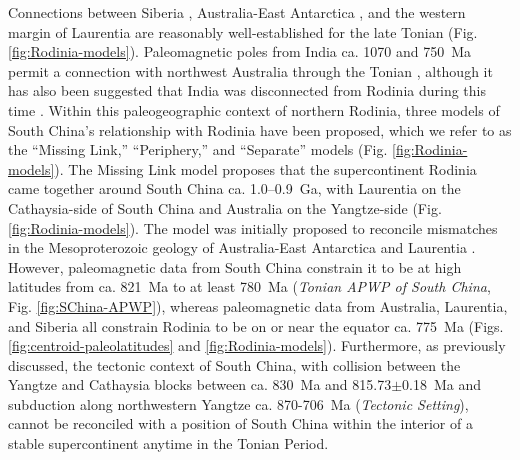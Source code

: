 Connections between Siberia \citep{Ernst2016a, Evans2016a}, Australia-East Antarctica \citep{Veevers1988a, Duebendorfer2002a, Goodge2008a, Goodge2010a, Li2011a, Swanson-Hysell2012a, Eyster2019a}, and the western margin of Laurentia are reasonably well-established for the late Tonian (Fig. \ref{fig:Rodinia-models}). Paleomagnetic poles from India ca. 1070 and 750~Ma permit a connection with northwest Australia through the Tonian \citep{Swanson-Hysell2012a}, although it has also been suggested that India was disconnected from Rodinia during this time \citep{Merdith2017a}. Within this paleogeographic context of northern Rodinia, three models of South China's relationship with Rodinia have been proposed, which we refer to as the ``Missing Link,'' ``Periphery,'' and ``Separate'' models (Fig. \ref{fig:Rodinia-models}). The Missing Link model proposes that the supercontinent Rodinia came together around South China ca. 1.0--0.9~Ga, with Laurentia on the Cathaysia-side of South China and Australia on the Yangtze-side (Fig. \ref{fig:Rodinia-models}). The model was initially proposed to reconcile mismatches in the Mesoproterozoic geology of Australia-East Antarctica and Laurentia \citep{Li1995a}. However, paleomagnetic data from South China constrain it to be at high latitudes from ca. 821~Ma to at least 780~Ma (\textit{Tonian APWP of South China}, Fig. \ref{fig:SChina-APWP}), whereas paleomagnetic data from Australia, Laurentia, and Siberia all constrain Rodinia to be on or near the equator ca. 775~Ma (Figs. \ref{fig:centroid-paleolatitudes} and \ref{fig:Rodinia-models}). Furthermore, as previously discussed, the tectonic context of South China, with collision between the Yangtze and Cathaysia blocks between ca. 830~Ma and 815.73$\pm$0.18~Ma and subduction along northwestern Yangtze ca. 870-706~Ma (\textit{Tectonic Setting}), cannot be reconciled with a position of South China within the interior of a stable supercontinent anytime in the Tonian Period.

